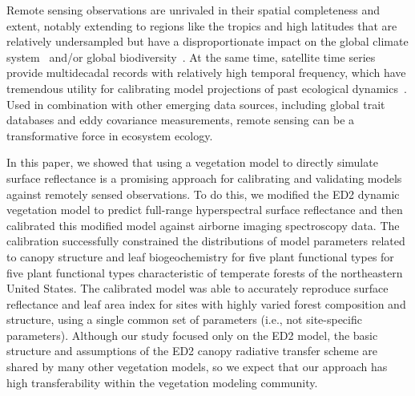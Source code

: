 \conclusions  %

Remote sensing observations are unrivaled in their spatial completeness and extent, notably extending to regions like the tropics and high latitudes that are relatively undersampled but have a disproportionate impact on the global climate system~\citep{schimel2015observing} and/or global biodiversity~\citep{jetz_2016_monitoring}.
At the same time, satellite time series provide multidecadal records with relatively high temporal frequency, which have tremendous utility for calibrating model projections of past ecological dynamics~\citep{kennedy2014bringing, pasquarella2016imagery}.
Used in combination with other emerging data sources, including global trait databases and eddy covariance measurements, remote sensing can be a transformative force in ecosystem ecology.

In this paper, we showed that using a vegetation model to directly simulate surface reflectance is a promising approach for calibrating and validating models against remotely sensed observations.
To do this, we modified the ED2 dynamic vegetation model to predict full-range hyperspectral surface reflectance and then calibrated this modified model against airborne imaging spectroscopy data.
The calibration successfully constrained the distributions of model parameters related to canopy structure and leaf biogeochemistry for five plant functional types for five plant functional types characteristic of temperate forests of the northeastern United States.
The calibrated model was able to accurately reproduce surface reflectance and leaf area index for sites with highly varied forest composition and structure, using a single common set of parameters (i.e., not site-specific parameters).
Although our study focused only on the ED2 model, the basic structure and assumptions of the ED2 canopy radiative transfer scheme are shared by many other vegetation models, so we expect that our approach has high transferability within the vegetation modeling community.
